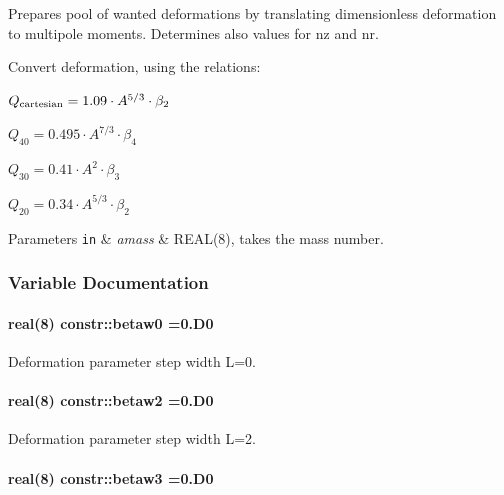 Prepares pool of wanted deformations by translating dimensionless deformation to multipole moments. Determines also values for {\ttfamily nz} and {\ttfamily nr}. 

Convert deformation, using the relations\+:
\begin{DoxyItemize}
\item $ Q_{\rm cartesian} = 1.09 \cdot A^{5/3} \cdot \beta_2 $
\item $ Q_{40} = 0.495 \cdot A^{7/3} \cdot \beta_4 $
\item $ Q_{30} = 0.41 \cdot A^{2} \cdot \beta_3 $
\item $ Q_{20} = 0.34 \cdot A^{5/3} \cdot \beta_2 $ 
\begin{DoxyParams}[1]{Parameters}
\mbox{\tt in}  & {\em amass} & R\+E\+A\+L(8), takes the mass number. \\
\hline
\end{DoxyParams}

\end{DoxyItemize}

\subsubsection{Variable Documentation}
\paragraph[{\texorpdfstring{betaw0}{betaw0}}]{\setlength{\rightskip}{0pt plus 5cm}real(8) constr\+::betaw0 =0.\+D0}\hypertarget{namespaceconstr_af683ee0f56a77110349e1fcde0234c2d}{}\label{namespaceconstr_af683ee0f56a77110349e1fcde0234c2d}


Deformation parameter step width L=0. 

\paragraph[{\texorpdfstring{betaw2}{betaw2}}]{\setlength{\rightskip}{0pt plus 5cm}real(8) constr\+::betaw2 =0.\+D0}\hypertarget{namespaceconstr_add6480c3e1f2dfa1411754faf59a988f}{}\label{namespaceconstr_add6480c3e1f2dfa1411754faf59a988f}


Deformation parameter step width L=2. 

\paragraph[{\texorpdfstring{betaw3}{betaw3}}]{\setlength{\rightskip}{0pt plus 5cm}real(8) constr\+::betaw3 =0.\+D0}\hypertarget{namespaceconstr_a6c448dea7ffa364b53159d44dab6caaf}{}\label{namespaceconstr_a6c448dea7ffa364b53159d44dab6caaf}


